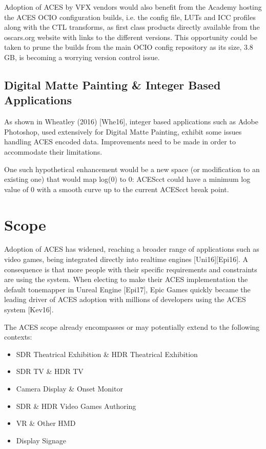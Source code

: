 \documentclass[conference]{IEEEtran}
\begin{document}
Adoption of ACES by VFX vendors would also benefit from the Academy hosting the ACES OCIO configuration builds, i.e. the config file, LUTs and ICC profiles along with the CTL transforms, as first class products directly available from the oscars.org website with links to the different versions. This opportunity could be taken to prune the builds from the main OCIO config repository as its size, 3.8 GB, is becoming a worrying version control issue.

\subsection{Digital Matte Painting \& Integer Based Applications}
As shown in Wheatley (2016) [Whe16], integer based applications such as Adobe Photoshop, used extensively for Digital Matte Painting, exhibit some issues handling ACES encoded data. Improvements need to be made in order to accommodate their limitations.

One such hypothetical enhancement would be a new space (or modification to an existing one) that would map log(0) to 0: ACEScct could have a minimum log value of 0 with a smooth curve up to the current ACEScct break point.

\section{Scope}
Adoption of ACES has widened, reaching a broader range of applications such as video games, being integrated directly into realtime engines [Uni16][Epi16]. A consequence is that more people with their specific requirements and constraints are using the system. When electing to make their ACES implementation the default tonemapper in Unreal Engine [Epi17], Epic Games quickly became the leading driver of ACES adoption with millions of developers using the ACES system [Kev16].

The ACES scope already encompasses or may potentially extend to the following contexts:
\begin{itemize}
	\item SDR Theatrical Exhibition \& HDR Theatrical Exhibition
	\item SDR TV \& HDR TV
	\item Camera Display \& Onset Monitor
	\item SDR \& HDR Video Games Authoring
	\item VR \& Other HMD
	\item Display Signage
\end{itemize}
\end{document}

